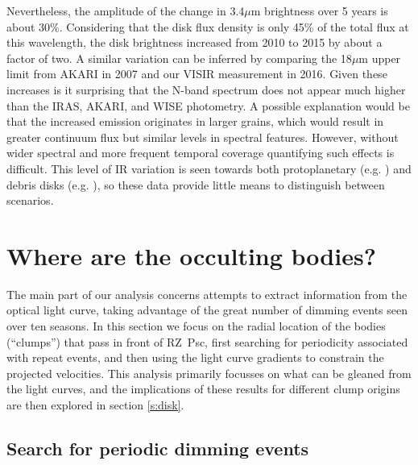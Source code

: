 \documentclass[]{rsos}
\begin{document}
Nevertheless, the amplitude of the change in 3.4$\mu$m brightness over 5 years is about
30\%. Considering that the disk flux density is only 45\% of the total flux at this
wavelength, the disk brightness increased from 2010 to 2015 by about a factor of two. A
similar variation can be inferred by comparing the 18$\mu$m upper limit from AKARI in
2007 and our VISIR measurement in 2016. Given these increases is it surprising that the
N-band spectrum does not appear much higher than the IRAS, AKARI, and WISE photometry. A
possible explanation would be that the increased emission originates in larger grains,
which would result in greater continuum flux but similar levels in spectral
features. However, without wider spectral and more frequent temporal coverage quantifying
such effects is difficult. This level of IR variation is seen towards both protoplanetary
(e.g. \cite{2011ApJ...728...49E,2014ApJ...791...42Z}) and debris disks
(e.g. \cite{2012ApJ...751L..17M,2012Natur.487...74M,2014Sci...345.1032M}), so these data
provide little means to distinguish between scenarios.

\section{Where are the occulting bodies?}\label{s:where}

The main part of our analysis concerns attempts to extract information from the optical
light curve, taking advantage of the great number of dimming events seen over ten
seasons. In this section we focus on the radial location of the bodies (``clumps'') that
pass in front of RZ~Psc, first searching for periodicity associated with repeat events,
and then using the light curve gradients to constrain the projected velocities. This
analysis primarily focusses on what can be gleaned from the light curves, and the
implications of these results for different clump origins are then explored in section
\ref{s:disk}.

\subsection{Search for periodic dimming events}\label{ss:per}
\end{document}
